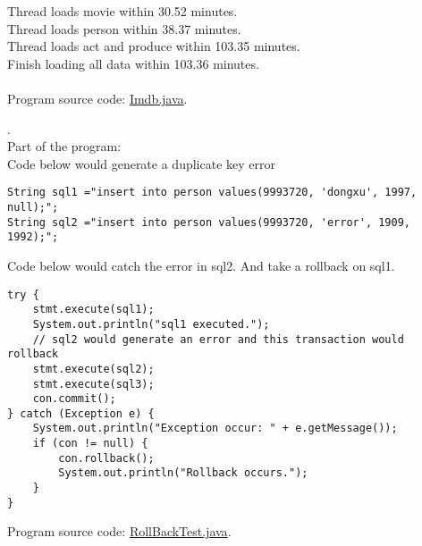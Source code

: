 \documentclass[a4paper]{article}
\begin{document}
Thread loads movie within 30.52 minutes.\\
Thread loads person within 38.37 minutes.\\
Thread loads act and produce within 103.35 minutes.\\
Finish loading all data within 103.36 minutes.\\\\
Program source code: \href{run:./Imdb.java}{Imdb.java}.\\
\par
{}.\\
Part of the program:\\
Code below would generate a duplicate key error
\begin{lstlisting}
String sql1 ="insert into person values(9993720, 'dongxu', 1997, null);";
String sql2 ="insert into person values(9993720, 'error', 1909, 1992);";
\end{lstlisting}
Code below would catch the error in sql2. And take a rollback on sql1.
\begin{lstlisting}
try {
    stmt.execute(sql1);
    System.out.println("sql1 executed.");
    // sql2 would generate an error and this transaction would rollback
    stmt.execute(sql2);
    stmt.execute(sql3);
    con.commit();
} catch (Exception e) {
    System.out.println("Exception occur: " + e.getMessage());
    if (con != null) {
        con.rollback();
        System.out.println("Rollback occurs.");
    }
}
\end{lstlisting}
Program source code: \href{run:./RollBackTest.java}{RollBackTest.java}.\\
\end{document}
